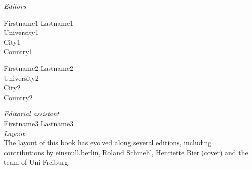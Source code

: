 %
\clearpage

\textit{Editors}\\
\begin{minipage}[t]{6cm}
    Firstname1 Lastname1\\
    University1\\
    City1\\
    Country1
\end{minipage}
\begin{minipage}[t]{6cm}
  Firstname2 Lastname2\\
  University2\\
  City2\\
  Country2
\end{minipage}

\vspace{5mm}


\textit{Editorial assistant}\\
Firstname3 Lastname3\\

\textit{Layout}\\
The layout of this book has evolved along several editions, including contributions by einsnull.berlin, Roland Schmehl, Henriette Bier (cover) and the team of Uni Freiburg.\\

